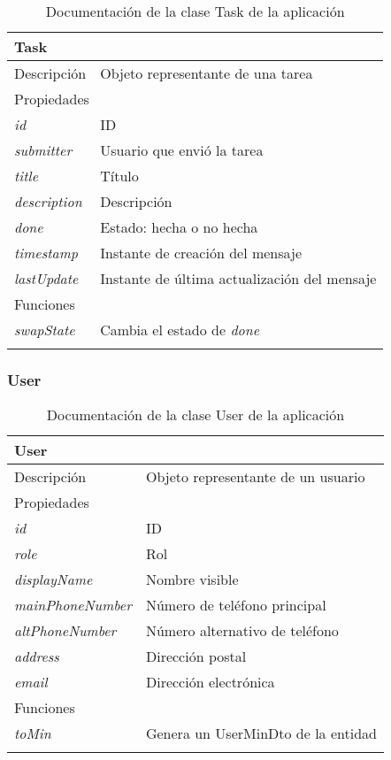 \begin{longtable}{|p{} p{}|}
    \hline
    \multicolumn{2}{|l|}{\textbf{Task}} \\ \hline \hline
    Descripción      & Objeto representante de una tarea \\ \hline
    \multicolumn{2}{|l|}{Propiedades} \\
    \emph{id}  & ID \\
    \emph{submitter}  & Usuario que envió la tarea \\
    \emph{title}  & Título \\
    \emph{description}  & Descripción \\
    \emph{done}  & Estado: hecha o no hecha \\
    \emph{timestamp}  & Instante de creación del mensaje \\
    \emph{lastUpdate}  & Instante de última actualización del mensaje \\  \hline
    \multicolumn{2}{|l|}{Funciones} \\
    \emph{swapState}  & Cambia el estado de \emph{done} \\ \hline
    \caption{Documentación de la clase Task de la aplicación}
    \label{dis:app:task}
\end{longtable}

\subsubsection{User}

\begin{longtable}{|p{} p{}|}
    \hline
    \multicolumn{2}{|l|}{\textbf{User}} \\ \hline \hline
    Descripción      & Objeto representante de un usuario \\ \hline
    \multicolumn{2}{|l|}{Propiedades} \\
    \emph{id}  & ID \\
    \emph{role}  & Rol \\
    \emph{displayName}  & Nombre visible \\
    \emph{mainPhoneNumber}  & Número de teléfono principal \\
    \emph{altPhoneNumber}  & Número alternativo de teléfono \\
    \emph{address}  & Dirección postal \\
    \emph{email}  & Dirección electrónica \\  \hline
    \multicolumn{2}{|l|}{Funciones} \\
    \emph{toMin}  & Genera un UserMinDto de la entidad \\ \hline
    \caption{Documentación de la clase User de la aplicación}
    \label{dis:app:user}
\end{longtable}

